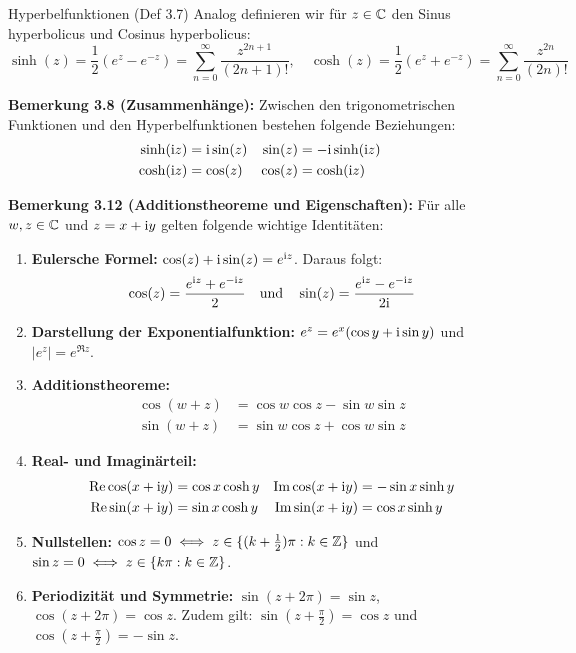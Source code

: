 \begin{defi}{Hyperbelfunktionen (Def 3.7)}
Analog definieren wir für $z \in \mathbb{C}$ den Sinus hyperbolicus und Cosinus hyperbolicus:
\[ \sinh(z) = \frac{1}{2}(e^z - e^{-z}) = \sum_{n=0}^\infty \frac{z^{2n+1}}{(2n+1)!}, \quad \cosh(z) = \frac{1}{2}(e^z + e^{-z}) = \sum_{n=0}^\infty \frac{z^{2n}}{(2n)!} \]
\end{defi}

\textbf{Bemerkung 3.8 (Zusammenhänge):}
Zwischen den trigonometrischen Funktionen und den Hyperbelfunktionen bestehen folgende Beziehungen:
\begin{align*}
    \sinh(\mathrm{i} z) &= \mathrm{i} \sin(z)  & \sin(z) &= -\mathrm{i} \sinh(\mathrm{i} z) \\
    \cosh(\mathrm{i} z) &= \cos(z) & \cos(z) &= \cosh(\mathrm{i} z)
\end{align*}

\textbf{Bemerkung 3.12 (Additionstheoreme und Eigenschaften):}
Für alle $w, z \in \mathbb{C}$ und $z = x + \mathrm{i} y$ gelten folgende wichtige Identitäten:
\begin{enumerate}
    \item \textbf{Eulersche Formel:} $\cos(z) + \mathrm{i} \sin(z) = e^{\mathrm{i} z}$. Daraus folgt:
    \[ \cos(z) = \frac{e^{\mathrm{i} z} + e^{-\mathrm{i} z}}{2} \quad \text{und} \quad \sin(z) = \frac{e^{\mathrm{i} z} - e^{-\mathrm{i} z}}{2\mathrm{i}} \]
    \item \textbf{Darstellung der Exponentialfunktion:} $e^z = e^x (\cos y + \mathrm{i} \sin y)$ und $|e^z| = e^{\Re z}$.
    \item \textbf{Additionstheoreme:}
    \begin{align*}
        \cos(w+z) &= \cos w \cos z - \sin w \sin z \\
        \sin(w+z) &= \sin w \cos z + \cos w \sin z
    \end{align*}
    \item \textbf{Real- und Imaginärteil:}
    \begin{align*}
        \operatorname{Re} \cos(x+\mathrm{i} y) &= \cos x \cosh y & \operatorname{Im} \cos(x+\mathrm{i} y) &= -\sin x \sinh y \\
        \operatorname{Re} \sin(x+\mathrm{i} y) &= \sin x \cosh y & \operatorname{Im} \sin(x+\mathrm{i} y) &= \cos x \sinh y
    \end{align*}
    \item \textbf{Nullstellen:} 
    $\cos z = 0 \iff z \in \{ (k + \frac{1}{2})\pi : k \in \mathbb{Z} \}$ und $\sin z = 0 \iff z \in \{ k\pi : k \in \mathbb{Z} \}$.
    \item \textbf{Periodizität und Symmetrie:}
    $\sin(z + 2\pi) = \sin z$, $\cos(z + 2\pi) = \cos z$. Zudem gilt:
    $\sin(z + \frac{\pi}{2}) = \cos z$ und $\cos(z + \frac{\pi}{2}) = -\sin z$.
\end{enumerate}

